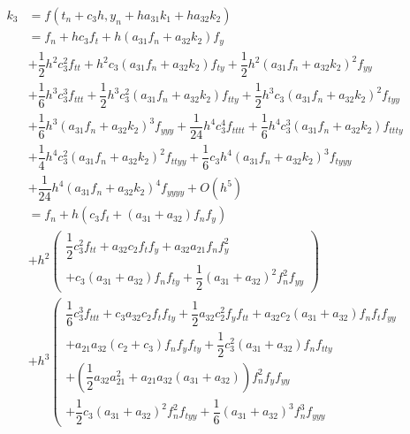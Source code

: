\documentclass[a4paper,oneside]{book}
\numberwithin{equation}{chapter}
\begin{document}
\begin{align}
{k_3}  &= f\left( {{t_n} + {c_3}h,{y_n} + h{a_{31}}{k_1} + h{a_{32}}{k_2}} \right)\\
& = {f_n} + h{c_3}{f_t} + h\left( {{a_{31}}{f_n} + {a_{32}}{k_2}} \right){f_y}\\
& + \dfrac{1}{2}{h^2}c_3^2{f_{tt}} + {h^2}{c_3}\left( {{a_{31}}{f_n} + {a_{32}}{k_2}} \right){f_{ty}} + \dfrac{1}{2}{h^2}{\left( {{a_{31}}{f_n} + {a_{32}}{k_2}} \right)^2}{f_{yy}}\\
& + \dfrac{1}{6}{h^3}c_3^3{f_{ttt}} + \dfrac{1}{2}{h^3}c_3^2\left( {{a_{31}}{f_n} + {a_{32}}{k_2}} \right){f_{tty}} + \dfrac{1}{2}{h^3}{c_3}{\left( {{a_{31}}{f_n} + {a_{32}}{k_2}} \right)^2}{f_{tyy}}\\
& + \dfrac{1}{6}{h^3}{\left( {{a_{31}}{f_n} + {a_{32}}{k_2}} \right)^3}{f_{yyy}} + \dfrac{1}{{24}}{h^4}c_3^4{f_{tttt}} + \dfrac{1}{6}{h^4}c_3^3\left( {{a_{31}}{f_n} + {a_{32}}{k_2}} \right){f_{ttty}}\\
& + \dfrac{1}{4}{h^4}c_3^2{\left( {{a_{31}}{f_n} + {a_{32}}{k_2}} \right)^2}{f_{ttyy}} + \dfrac{1}{6}{c_3}{h^4}{\left( {{a_{31}}{f_n} + {a_{32}}{k_2}} \right)^3}{f_{tyyy}}\\
& + \dfrac{1}{{24}}{h^4}{\left( {{a_{31}}{f_n} + {a_{32}}{k_2}} \right)^4}{f_{yyyy}} + O\left( {{h^5}} \right)\\
& = {f_n} + h\left( {{c_3}{f_t} + \left( {{a_{31}} + {a_{32}}} \right){f_n}{f_y}} \right)\\
 &+ {h^2}\left( \begin{array}{l}
\dfrac{1}{2}c_3^2{f_{tt}} + {a_{32}}{c_2}{f_t}{f_y} + {a_{32}}{a_{21}}{f_n}f_y^2\\
 + {c_3}\left( {{a_{31}} + {a_{32}}} \right){f_n}{f_{ty}} + \dfrac{1}{2}{\left( {{a_{31}} + {a_{32}}} \right)^2}f_n^2{f_{yy}}
\end{array} \right)\\
& + {h^3}\left( \begin{array}{l}
\dfrac{1}{6}c_3^3{f_{ttt}} + {c_3}{a_{32}}{c_2}{f_t}{f_{ty}} + \dfrac{1}{2}{a_{32}}c_2^2{f_y}{f_{tt}} + {a_{32}}{c_2}\left( {{a_{31}} + {a_{32}}} \right){f_n}{f_t}{f_{yy}}\\
 + {a_{21}}{a_{32}}\left( {{c_2} + {c_3}} \right){f_n}{f_y}{f_{ty}} + \dfrac{1}{2}c_3^2\left( {{a_{31}} + {a_{32}}} \right){f_n}{f_{tty}}\\
 + \left( {\dfrac{1}{2}{a_{32}}a_{21}^2 + {a_{21}}{a_{32}}\left( {{a_{31}} + {a_{32}}} \right)} \right)f_n^2{f_y}{f_{yy}}\\
 + \dfrac{1}{2}{c_3}{\left( {{a_{31}} + {a_{32}}} \right)^2}f_n^2{f_{tyy}} + \dfrac{1}{6}{\left( {{a_{31}} + {a_{32}}} \right)^3}f_n^3{f_{yyy}}

\end{array}
\end{align}
\end{document}
